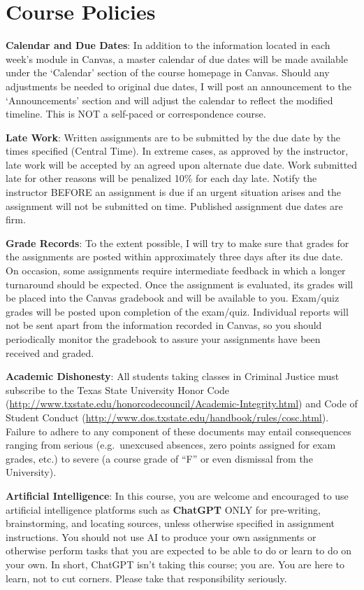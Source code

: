 \documentclass[11pt,]{article}
\begin{document}
\section{Course Policies}\label{course-policies}

\textbf{Calendar and Due Dates}: In addition to the information located
in each week's module in Canvas, a master calendar of due dates will be
made available under the `Calendar' section of the course homepage in
Canvas. Should any adjustments be needed to original due dates, I will
post an announcement to the `Announcements' section and will adjust the
calendar to reflect the modified timeline. This is NOT a self-paced or
correspondence course.

\textbf{Late Work}: Written assignments are to be submitted by the due
date by the times specified (Central Time). In extreme cases, as
approved by the instructor, late work will be accepted by an agreed upon
alternate due date. Work submitted late for other reasons will be
penalized 10\% for each day late. Notify the instructor BEFORE an
assignment is due if an urgent situation arises and the assignment will
not be submitted on time. Published assignment due dates are firm.

\textbf{Grade Records}: To the extent possible, I will try to make sure
that grades for the assignments are posted within approximately three
days after its due date. On occasion, some assignments require
intermediate feedback in which a longer turnaround should be expected.
Once the assignment is evaluated, its grades will be placed into the
Canvas gradebook and will be available to you. Exam/quiz grades will be
posted upon completion of the exam/quiz. Individual reports will not be
sent apart from the information recorded in Canvas, so you should
periodically monitor the gradebook to assure your assignments have been
received and graded.

\textbf{Academic Dishonesty}: All students taking classes in Criminal
Justice must subscribe to the Texas State University Honor Code
(\url{http://www.txstate.edu/honorcodecouncil/Academic-Integrity.html})
and Code of Student Conduct
(\url{http://www.dos.txstate.edu/handbook/rules/cosc.html}). Failure to
adhere to any component of these documents may entail consequences
ranging from serious (e.g.~unexcused absences, zero points assigned for
exam grades, etc.) to severe (a course grade of ``F'' or even dismissal
from the University).

\textbf{Artificial Intelligence}: In this course, you are welcome and
encouraged to use artificial intelligence platforms such as
\textbf{ChatGPT} ONLY for pre-writing, brainstorming, and locating
sources, unless otherwise specified in assignment instructions. You
should not use AI to produce your own assignments or otherwise perform
tasks that you are expected to be able to do or learn to do on your own.
In short, ChatGPT isn't taking this course; you are. You are here to
learn, not to cut corners. Please take that responsibility seriously.
\end{document}
